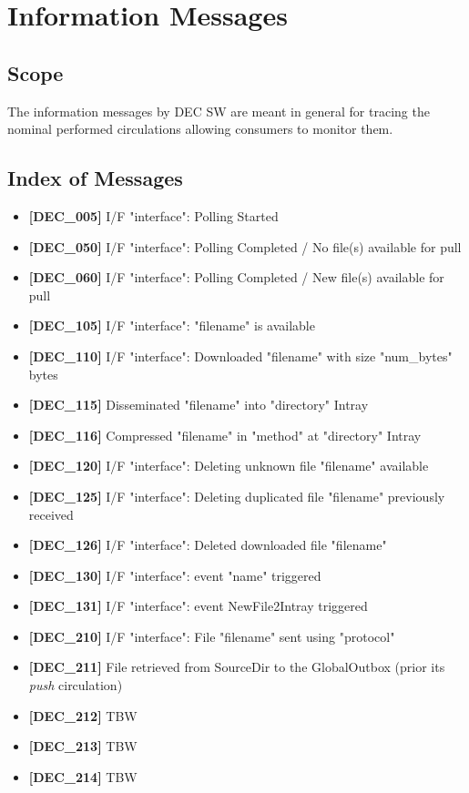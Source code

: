 \documentclass[dec_sum_main.tex]{subfiles}
\begin{document}

\section{Information Messages}

\subsection{Scope}
The information messages by DEC SW are meant in general for tracing the nominal performed circulations allowing consumers to monitor them.

\subsection{Index of Messages}

\begin{itemize}
	\item \textbf{[DEC\_005]} I/F "interface": Polling Started
	\item \textbf{[DEC\_050]} I/F "interface": Polling Completed / No file(s) available for pull	
	\item \textbf{[DEC\_060]} I/F "interface": Polling Completed / New file(s) available for pull
	\item \textbf{[DEC\_105]} I/F "interface": "filename" is available
	\item \textbf{[DEC\_110]} I/F "interface": Downloaded "filename" with size "num\_bytes" bytes
	\item \textbf{[DEC\_115]} Disseminated "filename" into "directory" Intray
	\item \textbf{[DEC\_116]} Compressed "filename" in "method" at "directory" Intray
	\item \textbf{[DEC\_120]} I/F "interface": Deleting unknown file "filename" available
	\item \textbf{[DEC\_125]} I/F "interface": Deleting duplicated file "filename" previously received 
	\item \textbf{[DEC\_126]} I/F "interface": Deleted downloaded file "filename"
	\item \textbf{[DEC\_130]} I/F "interface": event "name" triggered  	
	\item \textbf{[DEC\_131]} I/F "interface": event NewFile2Intray triggered
	\item \textbf{[DEC\_210]} I/F "interface": File "filename" sent using "protocol"
	\item \textbf{[DEC\_211]} File retrieved from SourceDir to the GlobalOutbox (prior its \textit{push} circulation) 
	\item \textbf{[DEC\_212]} TBW
	\item \textbf{[DEC\_213]} TBW
	\item \textbf{[DEC\_214]} TBW	
\end{itemize}
\end{document}
